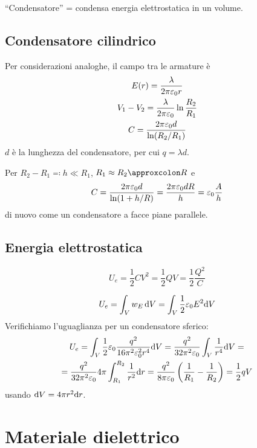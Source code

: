 ``Condensatore'' = condensa energia elettrostatica in un volume.


\subsection{Condensatore cilindrico}

Per considerazioni analoghe, il campo tra le armature è
\begin{gather}
    E(r) = \frac{\lambda}{2\pi\varepsilon_0 r} \\
    V_1 - V_2 = \frac{\lambda}{2\pi\varepsilon_0} \ln\frac{R_2}{R_1} \\
    C = \frac{2\pi\varepsilon_0 d}{\ln(R_2/R_1)}
\end{gather}
$d$ è la lunghezza del condensatore, per cui $q = \lambda d$.

Per $R_2 - R_1 \eqcolon h \ll R_1$, $R_1 \approx R_2 \approxcolon R$ e
\begin{equation}
    C = \frac{2\pi\varepsilon_0 d}{\ln(1 + h/R)} = \frac{2\pi\varepsilon_0 d R}{h}
    = \varepsilon_0 \frac{A}{h}
\end{equation}
di nuovo come un condensatore a facce piane parallele.

\subsection{Energia elettrostatica}

\begin{equation}
    U_e = \frac{1}{2} C V^2 = \frac{1}{2} Q V = \frac{1}{2} \frac{Q^2}{C}
\end{equation}

\begin{equation}
    U_e = \int_V w_E \, \mathrm{d} V = \int_V \frac{1}{2}\varepsilon_0 E^2 \mathrm{d} V
\end{equation}
Verifichiamo l'uguaglianza per un condensatore sferico:
\begin{equation}
\begin{gathered}
    U_e = \int_V \frac{1}{2}\varepsilon_0 \frac{q^2}{16\pi^2\varepsilon_0^2 r^4} \mathrm{d} V
    = \frac{q^2}{32\pi^2\varepsilon_0} \int_V \frac{1}{r^4} \mathrm{d} V = \\
    = \frac{q^2}{32\pi^2\varepsilon_0} 4\pi \int_{R_1}^{R_2} \frac{1}{r^2} \mathrm{d} r
    = \frac{q^2}{8\pi\varepsilon_0} \left( \frac{1}{R_1} - \frac{1}{R_2} \right)
    = \frac{1}{2} q V
\end{gathered}
\end{equation}
usando $\mathrm{d} V = 4\pi r^2 \mathrm{d} r$.

\section{Materiale dielettrico}

